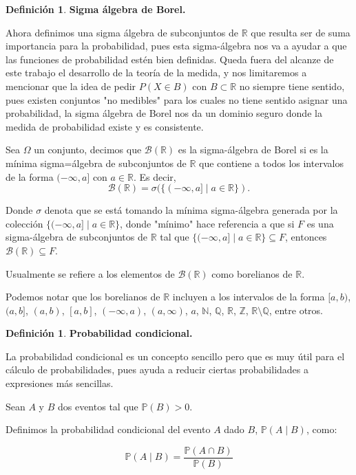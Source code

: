 \documentclass[
 12pt,
 letterpaper,
]{article}
\theoremstyle{teoremaBreak}
\theoremstyle{plain}
\theoremstyle{definition}
\newtheorem{definicion}[teorema]{Definición}
\begin{document}
\begin{definicion}
\textbf{Sigma álgebra de Borel.}

Ahora definimos una sigma álgebra de subconjuntos de $\mathbb{R}$ que resulta ser de suma importancia para la probabilidad, 
pues esta sigma-álgebra nos va a ayudar a que las funciones de probabilidad estén bien definidas.
Queda fuera del alcanze de este trabajo el desarrollo de la teoría de la medida, y nos limitaremos a 
mencionar que la idea de pedir $P(X \in B)$ con $B \subset \mathbb{R}$ no siempre tiene sentido, 
pues existen conjuntos "no medibles" para los cuales no tiene sentido asignar una probabilidad, la sigma álgebra 
de Borel nos da un dominio seguro donde la medida de probabilidad existe y es consistente.

Sea $\Omega$ un conjunto, decimos que $\mathcal{B}(\mathbb{R})$ es la sigma-álgebra de Borel 
si es la mínima sigma=álgebra de subconjuntos de $\mathbb{R}$ que contiene a todos los intervalos de la 
forma $(-\infty, a]$ con $a \in \mathbb{R}$. Es decir,
$$\mathcal{B}(\mathbb{R}) = \sigma(\{(-\infty, a] \mid a \in \mathbb{R}\}).$$

Donde $\sigma$ denota que se está tomando la mínima sigma-álgebra generada por la colección 
$\{(-\infty, a] \mid a \in \mathbb{R}\}$, donde "mínimo" hace referencia a que si $F$ es una sigma-álgebra 
de subconjuntos de $\mathbb{R}$ tal que $\{(-\infty, a] \mid a \in \mathbb{R}\} \subseteq F$, 
entonces $\mathcal{B}(\mathbb{R}) \subseteq F$.
\end{definicion}

Usualmente se refiere a los elementos de $\mathcal{B}(\mathbb{R})$ como borelianos de $\mathbb{R}$.

Podemos notar que los borelianos de $\mathbb{R}$ incluyen a los intervalos de la forma 
$[a, b)$, $(a, b]$, $(a, b)$, $[a, b]$, $(-\infty, a)$, $(a, \infty)$, ${{a}}$, $\mathbb{N}$, $\mathbb{Q}$, 
$\mathbb{R}$, $\mathbb{Z}$, $\mathbb{R} \setminus \mathbb{Q}$, entre otros.

\begin{definicion}
\textbf{Probabilidad condicional.}

La probabilidad condicional es un concepto sencillo pero que es muy útil
para el cálculo de probabilidades, pues ayuda a reducir ciertas
probabilidades a expresiones más sencillas.

Sean $A$ y $B$ dos eventos tal que $\mathbb{P}(B) > 0$.

Definimos la probabilidad condicional del evento $A$ dado $B$, $\mathbb{P}(A\mid B)$,
como:

\[
\mathbb{P}(A\mid B) = \dfrac{\mathbb{P}(A\cap B)}{\mathbb{P}(B)}
\]
\end{definicion}
\end{document}
